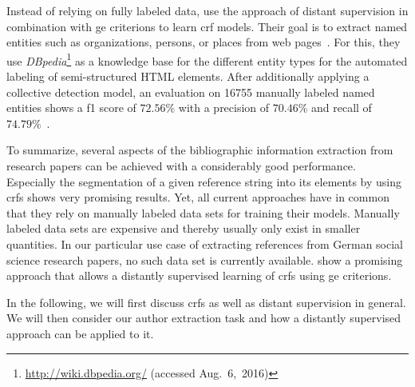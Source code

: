 \bigskip

Instead of relying on fully labeled data, \citet{lu2013web} use the approach of \gls{distant supervision} in combination with \glspl{ge criterion} to learn \gls{crf} models.
Their goal is to extract named entities such as organizations, persons, or places from web pages~\citep{lu2013web}.
For this, they use \textit{DBpedia}\footnote{\url{http://wiki.dbpedia.org/} (accessed Aug.~6,~2016)} as a knowledge base for the different entity types for the automated labeling of semi-structured HTML elements.
After additionally applying a collective detection model, an evaluation on \num{16755} manually labeled named entities shows a \gls{f1 score} of $72.56\%$ with a \gls{precision} of $70.46\%$ and \gls{recall} of $74.79\%$~\citep{lu2013web}.

\bigskip

To summarize, several aspects of the bibliographic information extraction from research papers can be achieved with a considerably good performance.
Especially the segmentation of a given reference string into its elements by using \glspl{crf} \citep{peng2004accurate,councill2008parscit,groza2012reference} shows very promising results.
Yet, all current approaches have in common that they rely on manually labeled data sets for training their models.
Manually labeled data sets are expensive and thereby usually only exist in smaller quantities.
In our particular use case of extracting references from German social science research papers, no such data set is currently available.
\citet{lu2013web} show a promising approach that allows a distantly supervised learning of \glspl{crf} using \glspl{ge criterion}.

In the following, we will first discuss \glspl{crf} as well as \gls{distant supervision} in general.
We will then consider our author extraction task and how a distantly supervised approach can be applied to it.

